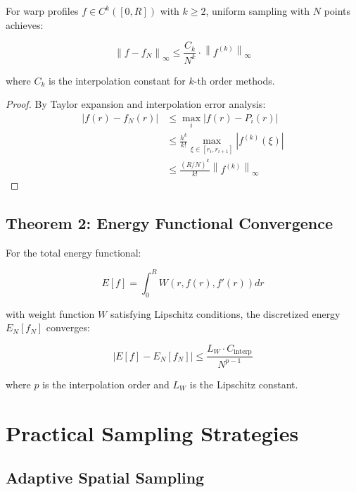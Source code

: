 \documentclass[12pt,a4paper]{article}
\begin{document}
\begin{theorem}
For warp profiles $f \in C^k([0,R])$ with $k \geq 2$, uniform sampling with $N$ points achieves:

\begin{equation}
\left\|f - f_N\right\|_{\infty} \leq \frac{C_k}{N^k} \cdot \left\|f^{(k)}\right\|_{\infty}
\end{equation}

where $C_k$ is the interpolation constant for $k$-th order methods.
\end{theorem}

\begin{proof}
By Taylor expansion and interpolation error analysis:
\begin{align}
|f(r) - f_N(r)| &\leq \max_{i} |f(r) - P_i(r)| \\
&\leq \frac{h^k}{k!} \max_{\xi \in [r_i, r_{i+1}]} |f^{(k)}(\xi)| \\
&\leq \frac{(R/N)^k}{k!} \left\|f^{(k)}\right\|_{\infty}
\end{align}
\end{proof}

\subsection{Theorem 2: Energy Functional Convergence}

\begin{theorem}
For the total energy functional:

\begin{equation}
E[f] = \int_0^R W(r, f(r), f'(r)) dr
\end{equation}

with weight function $W$ satisfying Lipschitz conditions, the discretized energy $E_N[f_N]$ converges:

\begin{equation}
|E[f] - E_N[f_N]| \leq \frac{L_W \cdot C_{\text{interp}}}{N^{p-1}}
\end{equation}

where $p$ is the interpolation order and $L_W$ is the Lipschitz constant.
\end{theorem}

\section{Practical Sampling Strategies}

\subsection{Adaptive Spatial Sampling}
\end{document}
